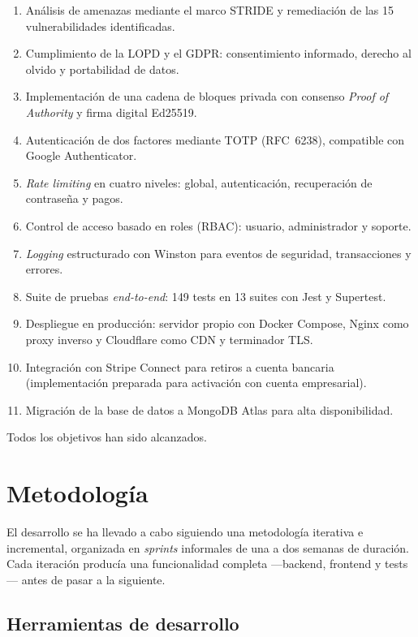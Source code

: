 \begin{enumerate}[label=F2.\arabic*]
  \item Análisis de amenazas mediante el marco STRIDE y remediación de las 15 vulnerabilidades identificadas.
  \item Cumplimiento de la LOPD y el GDPR: consentimiento informado, derecho al olvido y portabilidad de datos.
  \item Implementación de una cadena de bloques privada con consenso \emph{Proof of Authority} y firma digital Ed25519.
  \item Autenticación de dos factores mediante TOTP (RFC~6238), compatible con Google Authenticator.
  \item \emph{Rate limiting} en cuatro niveles: global, autenticación, recuperación de contraseña y pagos.
  \item Control de acceso basado en roles (RBAC): usuario, administrador y soporte.
  \item \emph{Logging} estructurado con Winston para eventos de seguridad, transacciones y errores.
  \item Suite de pruebas \emph{end-to-end}: 149 tests en 13 suites con Jest y Supertest.
  \item Despliegue en producción: servidor propio con Docker Compose, Nginx como proxy inverso y Cloudflare como CDN y terminador TLS.
  \item Integración con Stripe Connect para retiros a cuenta bancaria (implementación preparada para activación con cuenta empresarial).
  \item Migración de la base de datos a MongoDB Atlas para alta disponibilidad.
\end{enumerate}

Todos los objetivos han sido alcanzados.

\chapter{Metodología}\label{ch:metodologia}

El desarrollo se ha llevado a cabo siguiendo una metodología iterativa e incremental, organizada en \emph{sprints} informales de una a dos semanas de duración. Cada iteración producía una funcionalidad completa ---backend, frontend y tests--- antes de pasar a la siguiente.

\section{Herramientas de desarrollo}

